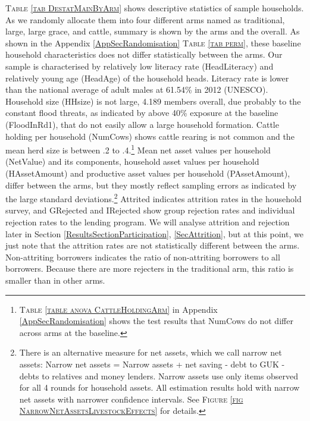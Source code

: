 \vspace{2ex}
	\textsc{\small Table \ref{tab DestatMainByArm}} shows descriptive statistics of sample households. As we randomly allocate them into four different arms named as \textsf{traditional}, \textsf{large}, \textsf{large grace}, and \textsf{cattle}, summary is shown by the arms and the overall. As shown in the Appendix \ref{AppSecRandomisation} \textsc{\normalsize Table \ref{tab perm}}, these baseline household characteristics does not differ statistically between the arms. Our sample is characterised by relatively low literacy rate (\textsf{HeadLiteracy}) and relatively young age (\textsf{HeadAge}) of the household heads. Literacy rate is lower than the national average of adult males at 61.54\% in 2012 (UNESCO). Household size (\textsf{HHsize}) is not large, 4.189 members overall, due probably to the constant flood threats, as indicated by above 40\% exposure at the baseline (\textsf{FloodInRd1}), that do not easily allow a large household formation. Cattle holding per household (\textsf{NumCows}) shows cattle rearing is not common and the mean herd size is between .2 to .4.\footnote{ \textsc{Table \ref{table anova CattleHoldingArm}} in Appendix \ref{AppSecRandomisation} shows the test results that \textsf{NumCows} do not differ across arms at the baseline. } Mean net asset values per household (\textsf{NetValue}) and its components, household asset values per household (\textsf{HAssetAmount}) and productive asset values per household (\textsf{PAssetAmount}), differ between the arms, but they mostly reflect sampling errors as indicated by the large standard deviations.\footnote{There is an alternative measure for net assets, which we call narrow net assets: Narrow net assets = Narrow assets + net saving - debt to GUK - debts to relatives and money lenders. Narrow assets use only items observed for all 4 rounds for household assets. All estimation results hold with narrow net assets with narrower confidence intervals. See \textsc{\footnotesize Figure \ref{fig NarrowNetAssetsLivestockEffects}} for details. } \textsf{Attrited} indicates attrition rates in the household survey, and \textsf{GRejected} and \textsf{IRejected} show group rejection rates and individual rejection rates to the lending program. We will analyse attrition and rejection later in Section \ref{ResultsSectionParticipation}, \ref{SecAttrition}, but at this point, we just note that the attrition rates are not statistically different between the arms. \textsf{Non-attriting borrowers} indicates the ratio of non-attriting borrowers to all borrowers. Because there are more rejecters in the \textsf{traditional} arm, this ratio is smaller than in other arms. 



